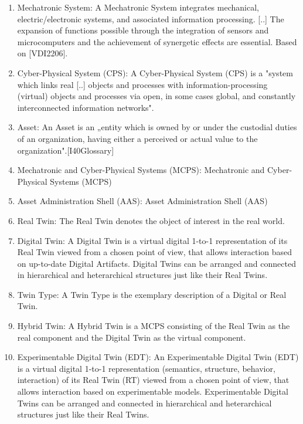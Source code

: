 
\begin{enumerate}

\item Mechatronic System: A Mechatronic System integrates mechanical, electric/electronic systems, and associated information processing. [..] The expansion of functions possible through the integration of sensors and microcomputers and the achievement of synergetic effects are essential. Based on [VDI2206].

\item Cyber-Physical System (CPS): A Cyber-Physical System (CPS) is a "system which links real [..] objects and processes with information-processing (virtual) objects and processes via open, in some cases global, and constantly interconnected information networks".

\item Asset: An Asset is an „entity which is owned by or under the custodial duties of an organization, having either a perceived or actual value to the organization".[I40Glossary]

\item Mechatronic and Cyber-Physical Systems (MCPS): Mechatronic and Cyber-Physical Systems (MCPS)

\item Asset Administration Shell (AAS): Asset Administration Shell (AAS)

\item Real Twin: The Real Twin denotes the object of interest in the real world.

\item Digital Twin: A Digital Twin is a virtual digital 1-to-1 representation of its Real Twin viewed from a chosen point of view, that allows interaction based on up-to-date Digital Artifacts. Digital Twins can be arranged and connected in hierarchical and heterarchical structures just like their Real Twins.

\item Twin Type: A Twin Type is the exemplary description of a Digital or Real Twin.

\item Hybrid Twin: A Hybrid Twin is a MCPS consisting of the Real Twin as the real component and the Digital Twin as the virtual component.

\item Experimentable Digital Twin (EDT): An Experimentable Digital Twin (EDT) is a virtual digital 1-to-1 representation (semantics, structure, behavior, interaction) of its Real Twin (RT) viewed from a chosen point of view, that allows interaction based on experimentable models. Experimentable Digital Twins can be arranged and connected in hierarchical and heterarchical structures just like their Real Twins.


\end{enumerate}
